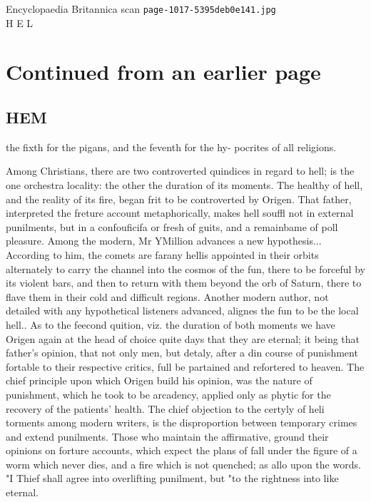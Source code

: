 \documentclass{article}
\begin{document}
\begin{center}
{\Large Encyclopaedia Britannica scan \texttt{page-1017-5395deb0e141.jpg}}\\[0.5em]
H E L
\end{center}
\section*{Continued from an earlier page}
\subsection*{HEM}
the fixth for the pigans, and the feventh for the hy- pocrites of all religions.

Among Christians, there are two controverted quindices in regard to hell; is the one orchestra locality: the other the duration of its moments. The healthy of hell, and the reality of its fire, began frit to be controverted by Origen. That father, interpreted the freture account metaphorically, makes hell souffl not in external punilments, but in a confouficifa or fresh of guits, and a remainbame of poll pleasure. Among the modern, Mr YMillion advances a new hypothesis... According to him, the comets are farany hellis appointed in their orbits alternately to carry the channel into the cosmos of the fun, there to be forceful by its violent bars, and then to return with them beyond the orb of Saturn, there to flave them in their cold and difficult regions. Another modern author, not detailed with any hypothetical listeners advanced, alignes the fun to be the local hell.. As to the feecond quition, viz. the duration of both moments we have Origen again at the head of choice quite days that they are eternal; it being that father’s opinion, that not only men, but detaly, after a din course of punishment fortable to their respective critics, full be partained and refortered to heaven. The chief principle upon which Origen build his opinion, was the nature of punishment, which he took to be arcadency, applied only as phytic for the recovery of the patients' health. The chief objection to the certyly of heli torments among modern writers, is the disproportion between temporary crimes and extend punilments. Those who maintain the affirmative, ground their opinions on forture accounts, which expect the plans of fall under the figure of a worm which never dies, and a fire which is not quenched; as allo upon the words. "I Thief shall agree into overlifting punilment, but "to the rightness into like eternal.
\end{document}
